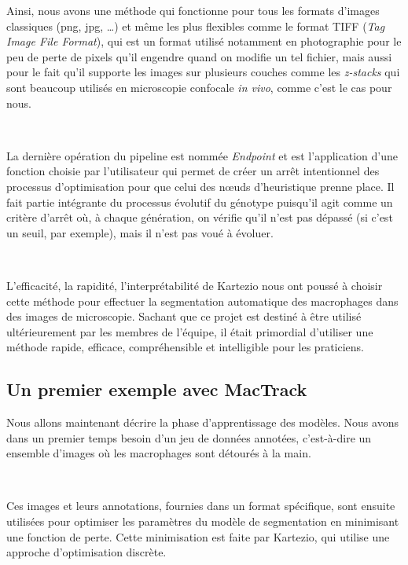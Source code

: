 \documentclass[a4paper,12pt]{report}
\begin{document}
Ainsi, nous avons une méthode qui fonctionne pour tous les formats d'images classiques (png, jpg, \dots) et même les plus flexibles comme le format TIFF (\textit{Tag Image File Format}), qui est un format utilisé notamment en photographie pour le peu de perte de pixels qu'il engendre quand on modifie un tel fichier, mais aussi pour le fait qu'il supporte les images sur plusieurs couches comme les \textit{z-stacks} qui sont beaucoup utilisés en microscopie confocale \textit{in vivo}, comme c'est le cas pour nous.

\

La dernière opération du pipeline est nommée \textit{Endpoint} et est l'application d'une fonction choisie par l'utilisateur qui permet de créer un arrêt intentionnel des processus d'optimisation pour que celui des nœuds d'heuristique prenne place. Il fait partie intégrante du processus évolutif du génotype puisqu'il agit comme un critère d'arrêt où, à chaque génération, on vérifie qu'il n'est pas dépassé (si c'est un seuil, par exemple), mais il n'est pas voué à évoluer.

\

L'efficacité, la rapidité, l'interprétabilité de Kartezio nous ont poussé à choisir cette méthode pour effectuer la segmentation automatique des macrophages dans des images de microscopie. Sachant que ce projet est destiné à être utilisé ultérieurement par les membres de l'équipe, il était primordial d'utiliser une méthode rapide, efficace, compréhensible et intelligible pour les praticiens.

\subsection{Un premier exemple avec MacTrack}\label{pratique}
Nous allons maintenant décrire la phase d'apprentissage des modèles. Nous avons dans un premier temps besoin d'un jeu de données annotées, c'est-à-dire un ensemble d'images où les macrophages sont détourés à la main.

\

Ces images et leurs annotations, fournies dans un format spécifique, sont ensuite utilisées pour optimiser les paramètres du modèle de segmentation en minimisant une fonction de perte. Cette minimisation est faite par Kartezio, qui utilise une approche d'optimisation discrète.
\end{document}
